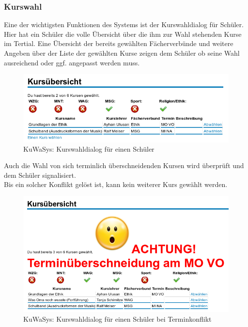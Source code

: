 \subsubsection{Kurswahl}
Eine der wichtigsten Funktionen des Systems ist der Kurswahldialog für Schüler. Hier hat ein Schüler die volle Übersicht über die ihm zur Wahl stehenden Kurse im Tertial. Eine Übersicht der bereits gewählten Fächerverbünde und weitere Angeben über der Liste der gewählten Kurse zeigen dem Schüler ob seine Wahl ausreichend oder ggf. angepasst werden muss. 
\begin{figure}[h]
 \begin{center}
   \includegraphics[scale=0.7]{img/kurswahl_KuWaSys.png}
 \end{center}
 \caption[\textbf{KuWaSys: Kurswahldialog für einen Schüler}]{KuWaSys: Kurswahldialog für einen Schüler}
 \label{fig:kurswahl_KuWaSys}
\end{figure}

Auch die Wahl von sich terminlich überschneidenden Kursen wird überprüft und dem Schüler signalisiert. \\Bis ein solcher Konflikt gelöst ist, kann kein weiterer Kurs gewählt werden. 
\begin{figure}[h]
 \begin{center}
   \includegraphics[scale=0.7]{img/kurswahl_konflikt_KuWaSys.png}
 \end{center}
 \caption[\textbf{KuWaSys: Kurswahldialog für einen Schüler bei Terminkonflikt}]{KuWaSys: Kurswahldialog für einen Schüler bei Terminkonflikt}
 \label{fig:kurswahl_konflikt_KuWaSys}
\end{figure}


